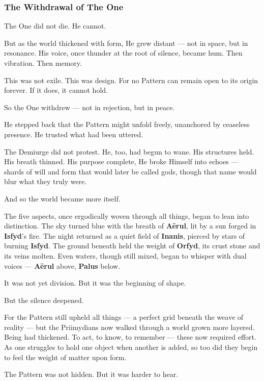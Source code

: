 \documentclass[12pt]{article}
\begin{document}
\dotfill

\subsubsection{The Withdrawal of The One}

The One did not die.  
He cannot.

But as the world thickened with form,  
He grew distant —  
not in space,  
but in resonance.  
His voice, once thunder at the root of silence,  
became hum.  
Then vibration.  
Then memory.

This was not exile.  
This was design.  
For no Pattern can remain open to its origin forever.  
If it does, it cannot hold.

So the One withdrew —  
not in rejection,  
but in peace.

He stepped back that the Pattern might unfold freely,  
unanchored by ceaseless presence.  
He trusted what had been uttered.

The Demiurge did not protest.  
He, too, had begun to wane.  
His structures held.  
His breath thinned.  
His purpose complete,  
He broke Himself into echoes —  
shards of will and form  
that would later be called gods,  
though that name would blur what they truly were.

And so the world became more itself.

The five aspects, once ergodically woven through all things,  
began to lean into distinction.  
The sky turned blue with the breath of \textbf{Aērul},  
lit by a sun forged in \textbf{Isfyd}’s fire.  
The night returned as a quiet field of \textbf{Inanis},  
pierced by stars of burning \textbf{Isfyd}.  
The ground beneath held the weight of \textbf{Orfyd},  
its crust stone and its veins molten.  
Even waters, though still mixed, began to whisper with dual voices —  
\textbf{Aērul} above, \textbf{Palus} below.

It was not yet division.  
But it was the beginning of shape.

But the silence deepened.

For the Pattern still upheld all things —  
a perfect grid beneath the weave of reality —  
but the Priimydians now walked through a world grown more layered.  
Being had thickened.  
To act, to know, to remember — these now required effort.  
As one struggles to hold one object when another is added,  
so too did they begin to feel the weight of matter upon form.

The Pattern was not hidden.  
But it was harder to hear.
\end{document}
